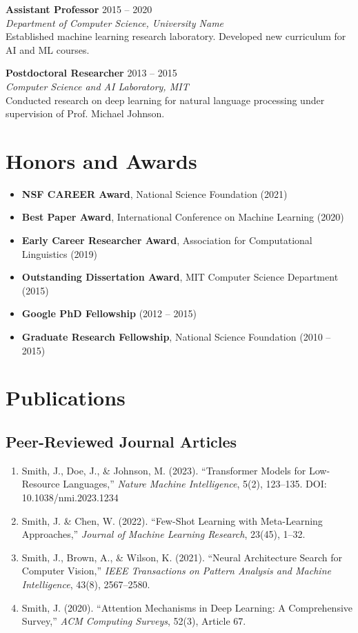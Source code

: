 \documentclass[11pt,letterpaper]{article}
\newcommand{\cventry}[4]{%
  \noindent\textbf{#1} \hfill #2\\
  \textit{#3}\\
  #4
  \vspace{0.3cm}
}
\begin{document}
\cventry{Assistant Professor}{2015 -- 2020}
{Department of Computer Science, University Name}
{Established machine learning research laboratory. Developed new curriculum for AI and ML courses.}

\cventry{Postdoctoral Researcher}{2013 -- 2015}
{Computer Science and AI Laboratory, MIT}
{Conducted research on deep learning for natural language processing under supervision of Prof. Michael Johnson.}

\section{Honors and Awards}

\begin{itemize}[leftmargin=*]
  \item \textbf{NSF CAREER Award}, National Science Foundation (2021)
  \item \textbf{Best Paper Award}, International Conference on Machine Learning (2020)
  \item \textbf{Early Career Researcher Award}, Association for Computational Linguistics (2019)
  \item \textbf{Outstanding Dissertation Award}, MIT Computer Science Department (2015)
  \item \textbf{Google PhD Fellowship} (2012 -- 2015)
  \item \textbf{Graduate Research Fellowship}, National Science Foundation (2010 -- 2015)
\end{itemize}

\section{Publications}

\subsection{Peer-Reviewed Journal Articles}

\begin{enumerate}[leftmargin=*]
  \item Smith, J., Doe, J., \& Johnson, M. (2023). ``Transformer Models for Low-Resource Languages,'' \textit{Nature Machine Intelligence}, 5(2), 123--135. DOI: 10.1038/nmi.2023.1234

  \item Smith, J. \& Chen, W. (2022). ``Few-Shot Learning with Meta-Learning Approaches,'' \textit{Journal of Machine Learning Research}, 23(45), 1--32.

  \item Smith, J., Brown, A., \& Wilson, K. (2021). ``Neural Architecture Search for Computer Vision,'' \textit{IEEE Transactions on Pattern Analysis and Machine Intelligence}, 43(8), 2567--2580.

  \item Smith, J. (2020). ``Attention Mechanisms in Deep Learning: A Comprehensive Survey,'' \textit{ACM Computing Surveys}, 52(3), Article 67.
\end{enumerate}
\end{document}

